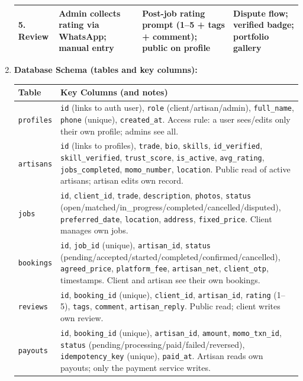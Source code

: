 \documentclass[11pt]{article}
\begin{document}
\begin{exoresolu}
\begin{enumerate}
\begin{center}
\begin{tabularx}{\linewidth}{|l|X|X|X|}
    \textbf{5. Review} & Admin collects rating via WhatsApp; manual entry & Post-job rating prompt (1--5 + tags + comment); public on profile & Dispute flow; verified badge; portfolio gallery \\ \hline
    \end{tabularx}
    \end{center}
    \item \textbf{Database Schema (tables and key columns):}
    \begin{center}
    \begin{tabularx}{\linewidth}{|l|X|}\hline
    \rowcolor{popblueL} \textbf{Table} & \textbf{Key Columns (and notes)} \\ \hline
    \texttt{profiles} & \texttt{id} (links to auth user), \texttt{role} (client/artisan/admin), \texttt{full\_name}, \texttt{phone} (unique), \texttt{created\_at}. Access rule: a user sees/edits only their own profile; admins see all. \\ \hline
    \texttt{artisans} & \texttt{id} (links to profiles), \texttt{trade}, \texttt{bio}, \texttt{skills}, \texttt{id\_verified}, \texttt{skill\_verified}, \texttt{trust\_score}, \texttt{is\_active}, \texttt{avg\_rating}, \texttt{jobs\_completed}, \texttt{momo\_number}, \texttt{location}. Public read of active artisans; artisan edits own record. \\ \hline
    \texttt{jobs} & \texttt{id}, \texttt{client\_id}, \texttt{trade}, \texttt{description}, \texttt{photos}, \texttt{status} (open/matched/in\_progress/completed/cancelled/disputed), \texttt{preferred\_date}, \texttt{location}, \texttt{address}, \texttt{fixed\_price}. Client manages own jobs. \\ \hline
    \texttt{bookings} & \texttt{id}, \texttt{job\_id} (unique), \texttt{artisan\_id}, \texttt{status} (pending/accepted/started/completed/confirmed/cancelled), \texttt{agreed\_price}, \texttt{platform\_fee}, \texttt{artisan\_net}, \texttt{client\_otp}, timestamps. Client and artisan see their own bookings. \\ \hline
    \texttt{reviews} & \texttt{id}, \texttt{booking\_id} (unique), \texttt{client\_id}, \texttt{artisan\_id}, \texttt{rating} (1--5), \texttt{tags}, \texttt{comment}, \texttt{artisan\_reply}. Public read; client writes own review. \\ \hline
    \texttt{payouts} & \texttt{id}, \texttt{booking\_id} (unique), \texttt{artisan\_id}, \texttt{amount}, \texttt{momo\_txn\_id}, \texttt{status} (pending/processing/paid/failed/reversed), \texttt{idempotency\_key} (unique), \texttt{paid\_at}. Artisan reads own payouts; only the payment service writes. \\ \hline

\end{tabularx}
\end{center}
\end{enumerate}
\end{exoresolu}
\end{document}
